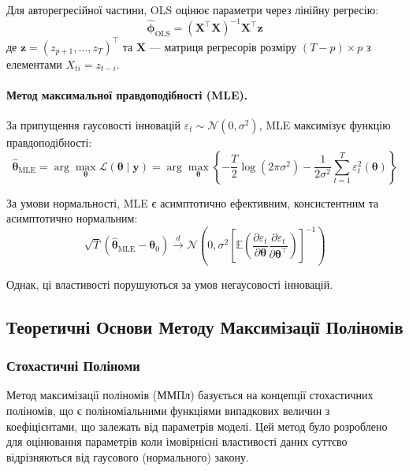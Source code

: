 \documentclass[12pt,a4paper]{article}
\newcommand{\E}{\mathbb{E}}
\begin{document}
Для авторегресійної частини, OLS оцінює параметри через лінійну регресію:
\begin{equation}
\label{eq:ols}
\hat{\boldsymbol{\phi}}_{\text{OLS}} = (\mathbf{X}^\top \mathbf{X})^{-1} \mathbf{X}^\top \mathbf{z}
\end{equation}
де $\mathbf{z} = (z_{p+1}, \ldots, z_T)^\top$ та $\mathbf{X}$ --- матриця регресорів розміру $(T-p) \times p$ з елементами $X_{ti} = z_{t-i}$.

\paragraph{Метод максимальної правдоподібності (MLE).}

За припущення гаусовості інновацій $\varepsilon_t \sim \mathcal{N}(0, \sigma^2)$, MLE максимізує функцію правдоподібності:
\begin{equation}
\label{eq:mle}
\hat{\boldsymbol{\theta}}_{\text{MLE}} = \arg\max_{\boldsymbol{\theta}} \mathcal{L}(\boldsymbol{\theta} \mid \mathbf{y}) = \arg\max_{\boldsymbol{\theta}} \left\{ -\frac{T}{2} \log(2\pi\sigma^2) - \frac{1}{2\sigma^2} \sum_{t=1}^{T} \varepsilon_t^2(\boldsymbol{\theta}) \right\}
\end{equation}

За умови нормальності, MLE є асимптотично ефективним, консистентним та асимптотично нормальним:
\begin{equation}
\label{eq:mle_asymptotic}
\sqrt{T}(\hat{\boldsymbol{\theta}}_{\text{MLE}} - \boldsymbol{\theta}_0) \xrightarrow{d} \mathcal{N}\left(0, \sigma^2 \left[\E\left(\frac{\partial \varepsilon_t}{\partial \boldsymbol{\theta}} \frac{\partial \varepsilon_t}{\partial \boldsymbol{\theta}^\top}\right)\right]^{-1}\right)
\end{equation}

Однак, ці властивості порушуються за умов негаусовості інновацій.

\subsection{Теоретичні Основи Методу Максимізації Поліномів}
\label{subsec:pmm_theory}

\subsubsection{Стохастичні Поліноми}

Метод максимізації поліномів (ММПл) базується на концепції стохастичних поліномів, що є поліноміальними функціями випадкових величин з коефіцієнтами, що залежать від параметрів моделі. Цей метод було розроблено для оцінювання параметрів коли імовірнісні властивості даних суттєво відрізняються від гаусового (нормального) закону.
\end{document}
